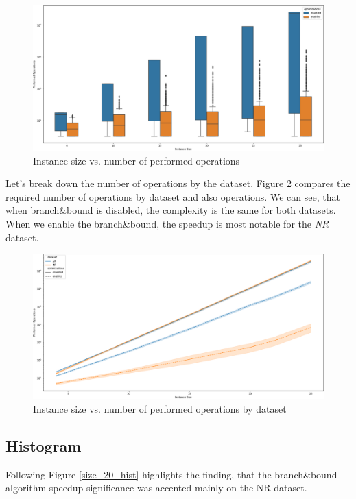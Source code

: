 \documentclass[a4paper,10pt]{article}
\begin{document}
\begin{figure}[!htb]
	\centering
  	\includegraphics[width=\textwidth]{size_vs_performed_boxplot.png}
	\caption{Instance size vs. number of performed operations}
	\label{size_vs_ops_boxplot}
\end{figure}

Let's break down the number of operations by the dataset. Figure \ref{size_vs_ops_lineplot} compares the required number of operations by dataset and also operations. We can see, that when branch\&bound is disabled, the complexity is the same for both datasets. When we enable the branch\&bound, the speedup is most notable for the \emph{NR} dataset.

\begin{figure}[!htb]
	\centering
  	\includegraphics[width=\textwidth]{size_vs_ops_lineplot.png}
	\caption{Instance size vs. number of performed operations by dataset}
	\label{size_vs_ops_lineplot}
\end{figure}

\clearpage

\subsection{Histogram}
Following Figure \ref{size_20_hist} highlights the finding, that the branch\&bound algorithm speedup significance was accented mainly on the NR dataset.
\end{document}
